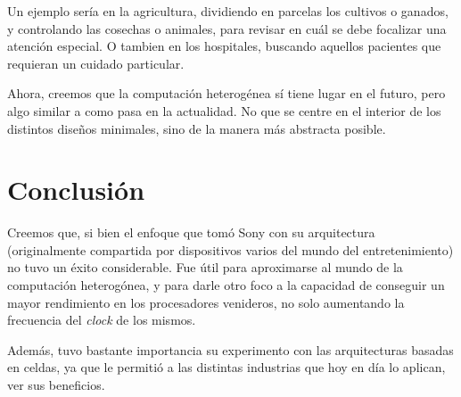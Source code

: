 \documentclass[10pt,compsoc]{IEEEtran}
\begin{document}
	Un ejemplo sería en la agricultura, dividiendo en parcelas los cultivos o ganados, y controlando las cosechas o animales, para revisar en cuál se debe focalizar una atención especial. O tambien en los hospitales, buscando aquellos pacientes que requieran un cuidado particular.\newline
	
	Ahora, creemos que la computación heterogénea sí tiene lugar en el futuro, pero algo similar a como pasa en la actualidad. No que se centre en el interior de los distintos diseños minimales, sino de la manera más abstracta posible.
	
	
	\section{Conclusión}
	\noindent Creemos que, si bien el enfoque que tomó Sony con su arquitectura (originalmente compartida por dispositivos varios del mundo del entretenimiento) no tuvo un éxito considerable. Fue útil para aproximarse al mundo de la computación heterogónea, y para darle otro foco a la capacidad de conseguir un mayor rendimiento en los procesadores venideros, no solo aumentando la frecuencia del \textit{clock} de los mismos.\newline
	
	Además, tuvo bastante importancia su experimento con las arquitecturas basadas en celdas, ya que le permitió a las distintas industrias que hoy en día lo aplican, ver sus beneficios.\newline
	
	
	
\end{document}
